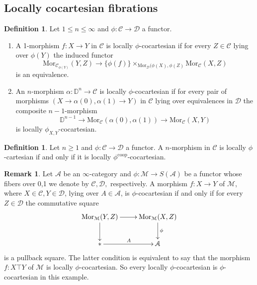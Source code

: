 \documentclass[10pt,oneside]{article}
\numberwithin{equation}{section} %
\numberwithin{figure}{section} %
\theoremstyle{plain}
\theoremstyle{definition}
\newtheorem{definition}[theorem]{Definition}
\newtheorem{remark}[theorem]{Remark}
\newcommand{\bD}{{\mathbb D}}
\newcommand{\mA}{{\mathcal A}}
\newcommand{\mC}{{\mathcal C}}
\newcommand{\mD}{{\mathcal D}}
\newcommand{\mM}{{\mathcal M}}
\newcommand{\n}{{n}}
\newcommand{\op}{\mathrm{op}}
\newcommand{\co}{\mathrm{co}}
\newcommand{\Mor}{{\mathrm{Mor}}}
\begin{document}
\subsection{Locally cocartesian fibrations}

\begin{definition}Let $1 \leq \n \leq \infty$ and $\phi: \mC \to \mD$ a functor.

\begin{enumerate}[\normalfont(1)]\setlength{\itemsep}{-2pt}


\item A 1-morphism $f: X \to Y$ in $\mC$ is locally $\phi$-cocartesian if for every $Z\in \mC$ lying over $\phi(Y) $ the induced functor
$$ \Mor_{\mC_{\phi(Y)}}(Y,Z) \to \{ \phi(f) \}\times_{\Mor_\mD(\phi(X), \phi(Z)} \Mor_\mC(X,Z) $$
is an equivalence.

\item An $n$-morphism $\alpha:\bD^n\to\mC$ is locally $\phi$-cocartesian if
for every pair of morphisms $(X \to \alpha(0), \alpha(1) \to Y)$ in $\mC$ lying over equivalences in $\mD$ the composite $n-1$-morphism
\[
\bD^{n-1}\to\Mor_\mC(\alpha(0),\alpha(1)) \to \Mor_\mC(X,Y)
\]
is locally $\phi_{X,Y}$-cocartesian.

\end{enumerate}

\end{definition}

\begin{definition}Let $\n \geq 1$ and $\phi: \mC \to \mD$ a functor.
A $n$-morphism in $\mC$ is locally $\phi$-cartesian if and only if
it is locally $\phi^{\co\op}$-cocartesian.
    
\end{definition}

\begin{remark}Let $\mA$ be an $\infty$-category and $\phi: \mM \to S(\mA)$ be a functor whose fibers over 0,1 we denote by $\mC, \mD,$ respectively.
A morphism $f: X \to Y$ of $\mM$, where $X \in \mC, Y \in \mD$, lying over $A \in \mA$, is $\phi$-cocartesian if and only if for every $Z\in \mD$ the commutative square 
\begin{equation}\label{filler4}
\begin{xy}
\xymatrix{
\Mor_\mM(Y,Z) \ar[d] \ar[r]
& \Mor_\mM(X,Z) \ar[d]^\phi
\\ 
\ast \ar[r]^{A} & \mA
}
\end{xy}\end{equation}
is a pullback square.
The latter condition is equivalent to say that the morphism $f: X \top Y$ of $\mM$ is locally $\phi$-cocartesian.
So every locally $\phi$-cocartesian is $\phi$-cocartesian in this example.

    
\end{remark}
\end{document}
